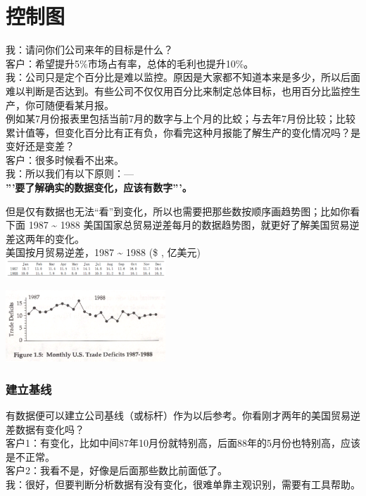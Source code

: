 \chapter{控制图} %

我：请问你们公司来年的目标是什么？\\
客户：希望提升5\%市场占有率，总体的毛利也提升10\%。\\
我：公司只是定个百分比是难以监控。原因是大家都不知道本来是多少，所以后面难以判断是否达到。有些公司不仅仅用百分比来制定总体目标，也用百分比监控生产，你可随便看某月报。\\
例如某7月份报表里包括当前7月的数字与上个月的比蛟；与去年7月份比较；比较累计值等，但变化百分比有正有负，你看完这种月报能了解生产的变化情况吗？是变好还是变差？\\
客户：很多时候看不出来。\\
我：所以我们有以下原则：---\\
\textbf{'''要了解确实的数据变化，应该有数字'''。}

但是仅有数据也无法``看''到变化，所以也需要把那些数按顺序画趋势图；比如你看下面
1987 \textasciitilde{} 1988
美国国家总贸易逆差每月的数据趋势图，就更好了解美国贸易逆差这两年的变化。\\
美国按月贸易逆差，1987 \textasciitilde{} 1988 (\$ , 亿美元)\\

\includegraphics[width=6cm]{The_key_fig1311.png}

\includegraphics[width=6cm]{The_key_fig151.png}

\hypertarget{ux5efaux7acbux57faux7ebf}{%
\subsection{建立基线}\label{ux5efaux7acbux57faux7ebf}}

有数据便可以建立公司基线（或标杆）作为以后参考。你看刚才两年的美国贸易逆差数据有变化吗？\\
客户1：有变化，比如中间87年10月份就特别高，后面88年的5月份也特别高，应该是不正常。\\
客户2：我看不是，好像是后面那些数比前面低了。\\
我：很好，但要判断分析数据有没有变化，很难单靠主观识别，需要有工具帮助。

